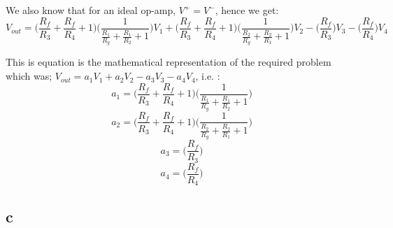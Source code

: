\documentclass{article}
\theoremstyle{plain}
\theoremstyle{definition}
\theoremstyle{remark}
\begin{document}
We also know that for an ideal op-amp, $V^+ = V^-$, hence we get:
$$ V_{out} = \Big( \frac{R_f}{R_3} + \frac{ R_f}{R_4} + 1\Big) \Big( \frac{1}{\frac{R_1}{R_g} + \frac{R_1}{R_2} + 1}\Big) V_1 + \Big( \frac{R_f}{R_3} + \frac{ R_f}{R_4} + 1\Big) \Big( \frac{1}{\frac{R_2}{R_g} + \frac{R_2}{R_1} + 1} \Big) V_2 - \Big( \frac{R_f}{R_3}\Big)V_3 - \Big( \frac{ R_f}{R_4}\Big)V_4$$

This is equation is the mathematical representation of the required problem which was; $V_{out} = a_1V_1 + a_2 V_2 - a_3 V_3 - a_4 V_4$, i.e. :
$$a_1 =  \Big( \frac{R_f}{R_3} + \frac{ R_f}{R_4} + 1\Big) \Big( \frac{1}{\frac{R_1}{R_g} + \frac{R_1}{R_2} + 1}\Big)$$
$$a_2 =  \Big( \frac{R_f}{R_3} + \frac{ R_f}{R_4} + 1\Big) \Big( \frac{1}{\frac{R_2}{R_g} + \frac{R_2}{R_1} + 1} \Big) $$
$$a_3 = \Big( \frac{R_f}{R_3}\Big)$$
$$a_4 = \Big( \frac{ R_f}{R_4}\Big)$$

\subsection*{c}
\end{document}
